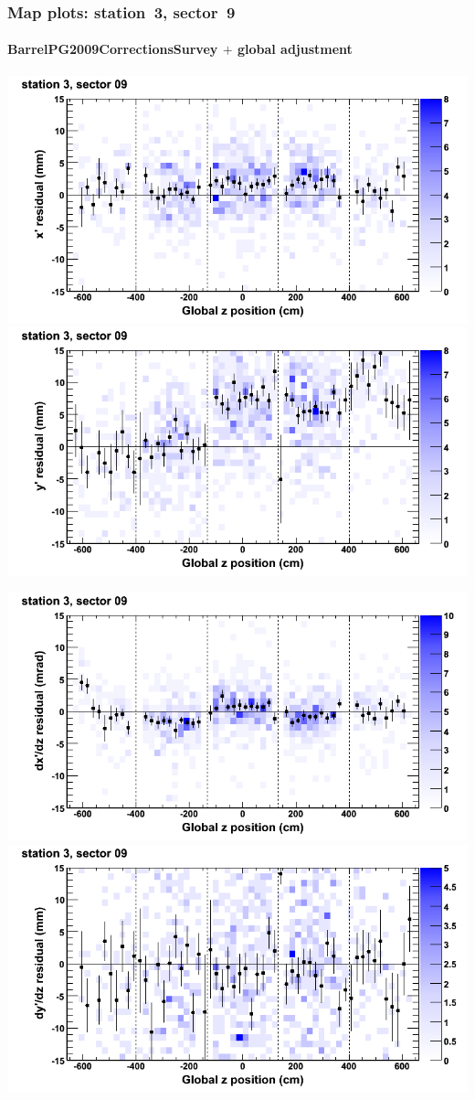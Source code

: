 \documentclass[compress]{beamer}
\begin{document}
\begin{frame}
\frametitle{Map plots: station~3, sector~9}
\framesubtitle{BarrelPG2009CorrectionsSurvey $+$ global adjustment}
\includegraphics[width=0.5\linewidth]{mapplots_re01/DTvsz_st3sec09_x.png}
\includegraphics[width=0.5\linewidth]{mapplots_re01/DTvsz_st3sec09_y.png}

\includegraphics[width=0.5\linewidth]{mapplots_re01/DTvsz_st3sec09_dxdz.png}
\includegraphics[width=0.5\linewidth]{mapplots_re01/DTvsz_st3sec09_dydz.png}
\end{frame}
\end{document}
